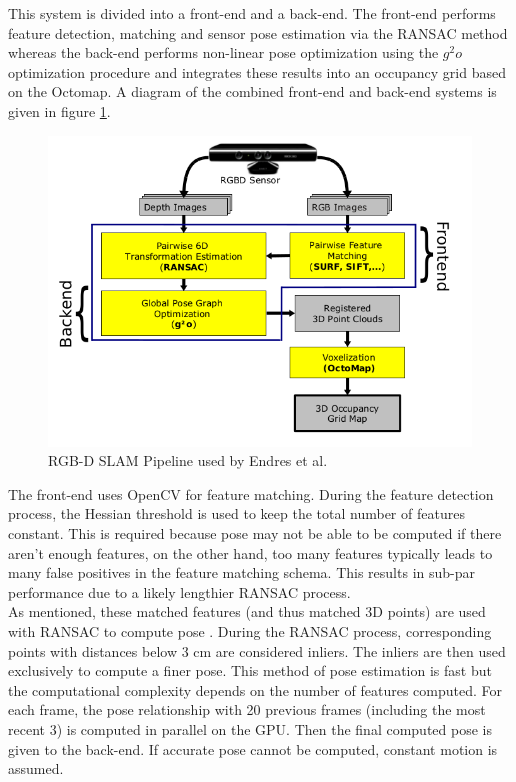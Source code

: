 This system is divided into a front-end and a back-end. The front-end performs feature detection, matching and sensor pose estimation via the RANSAC method whereas the back-end performs non-linear pose optimization using the $g^2o$ optimization procedure and integrates these results into an occupancy grid based on the Octomap. A diagram of the combined front-end and back-end systems is given in figure \ref{Endres12EvaluationPipeline}. 


\begin{figure}[!htb]
\centering
\includegraphics[width=12cm]{images/ch1/Endres12EvaluationPipeline}
\caption{RGB-D SLAM Pipeline used by Endres et al. \cite{Endres12Evaluation}}
\label{Endres12EvaluationPipeline}
\end{figure}


The front-end uses OpenCV \cite{Bradski08Learning} for feature matching. During the feature detection process, the Hessian threshold is used to keep the total number of features constant. This is required because pose may not be able to be computed if there aren't enough features, on the other hand, too many features typically leads to many false positives in the feature matching schema. This results in sub-par performance due to a likely lengthier RANSAC process. \\

As mentioned, these matched features (and thus matched 3D points) are used with RANSAC to compute pose \cite{Umeyama91Least}. During the RANSAC process, corresponding points with distances below 3 cm are considered inliers. The inliers are then used exclusively to compute a finer pose. This method of pose estimation is fast but the computational complexity depends on the number of features computed. For each frame, the pose relationship with 20 previous frames (including the most recent 3) is computed in parallel on the GPU. Then the final computed pose is given to the back-end. If accurate pose cannot be computed, constant motion is assumed. \\

